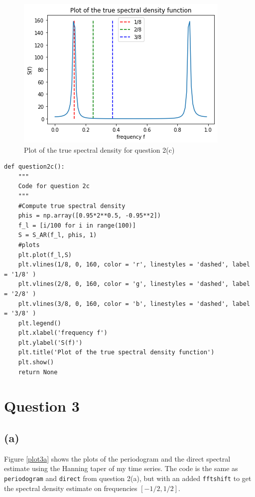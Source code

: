 \documentclass[a4paper,10pt]{article}
\theoremstyle{mytheor}
\begin{document}
\begin{figure}
    \centering
    \includegraphics{plot2c.png}
    \caption{Plot of the true spectral density for question 2(c)}
    \label{plot2c}
\end{figure}

\begin{lstlisting}
def question2c():
    """
    Code for question 2c
    """
    #Compute true spectral density
    phis = np.array([0.95*2**0.5, -0.95**2])
    f_l = [i/100 for i in range(100)]
    S = S_AR(f_l, phis, 1)
    #plots
    plt.plot(f_l,S)
    plt.vlines(1/8, 0, 160, color = 'r', linestyles = 'dashed', label = '1/8' )
    plt.vlines(2/8, 0, 160, color = 'g', linestyles = 'dashed', label = '2/8' )
    plt.vlines(3/8, 0, 160, color = 'b', linestyles = 'dashed', label = '3/8' )
    plt.legend()
    plt.xlabel('frequency f')
    plt.ylabel('S(f)')
    plt.title('Plot of the true spectral density function')
    plt.show()
    return None
\end{lstlisting}
\clearpage


\section*{Question 3}
\subsection*{(a)}

Figure \ref{plot3a} shows the plots of the periodogram and the direct spectral estimate using the Hanning taper of my time series. The code is the same as \texttt{periodogram} and \texttt{direct} from question 2(a), but with an added \texttt{fftshift} to get the spectral density estimate on frequencies $[-1/2, 1/2]$.
\end{document}

